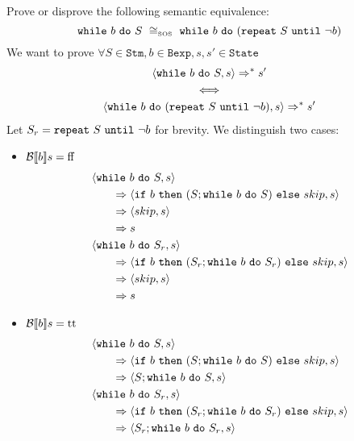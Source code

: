 \begin{exercise}{
    Prove or disprove the following semantic equivalence:
    \[ \wwhile{b}{S}\ \cong_{\text{\tiny SOS}}\ \wwhile{b}{(\wrepeat{S}{\neg b})}  \]
}
    We want to prove $\forall S \in \texttt{Stm}, b \in \texttt{Bexp}, s, s' \in \texttt{State}$
    \begin{gather*}
        \left<\texttt{while}\ b\ \texttt{do}\ S, s\right> \Rightarrow^* s' \\
        \iff \\
        \left<\texttt{while}\ b\ \texttt{do}\ (\texttt{repeat}\ S\ \texttt{until}\ \neg b), s\right> \Rightarrow^* s'
    \end{gather*}
    Let $S_r = \texttt{repeat}\ S\ \texttt{until}\ \neg b$ for brevity.
    We distinguish two cases:
    \begin{itemize}
        \item $\mathcal{B} \llbracket b \rrbracket s = \text{ff}$
            \begin{align*}
                &\left<\texttt{while}\ b\ \texttt{do}\ S, s\right>
                \\&\qquad\Rightarrow \left<\texttt{if}\ b\ \texttt{then}\ (S;\texttt{while}\ b\ \texttt{do}\ S)\ \texttt{else}\ skip, s\right>
                \\&\qquad\Rightarrow \left<skip, s\right>
                \\&\qquad\Rightarrow s
                \\
                &\left<\texttt{while}\ b\ \texttt{do}\ S_r, s\right>
                \\&\qquad\Rightarrow \left<\texttt{if}\ b\ \texttt{then}\ (S_r; \texttt{while}\ b\ \texttt{do}\ S_r)\ \texttt{else}\ skip, s\right>
                \\&\qquad\Rightarrow \left<skip, s\right>
                \\&\qquad\Rightarrow s
            \end{align*}
        \item $\mathcal{B} \llbracket b \rrbracket s = \text{tt}$
            \begin{align*}
                &\left<\texttt{while}\ b\ \texttt{do}\ S, s\right>
                \\&\qquad\Rightarrow \left<\texttt{if}\ b\ \texttt{then}\ (S;\texttt{while}\ b\ \texttt{do}\ S)\ \texttt{else}\ skip, s\right>
                \\&\qquad\Rightarrow \left<S;\texttt{while}\ b\ \texttt{do}\ S, s\right>
                \\
                &\left<\texttt{while}\ b\ \texttt{do}\ S_r, s\right>
                \\&\qquad\Rightarrow \left<\texttt{if}\ b\ \texttt{then}\ (S_r; \texttt{while}\ b\ \texttt{do}\ S_r)\ \texttt{else}\ skip, s\right>
                \\&\qquad\Rightarrow \left<S_r; \texttt{while}\ b\ \texttt{do}\ S_r, s\right>
            \end{align*}
            \begin{itemize}

\end{itemize}
\end{itemize}
\end{exercise}
